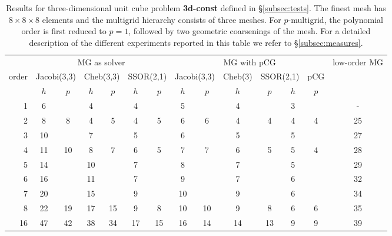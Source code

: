 \documentclass[smallcondensed,final]{svjour3}     %
\begin{document}
\begin{table}
  \caption{\label{tab:3d-box} Results for three-dimensional unit cube
    problem  {\bf 3d-const} defined in \S\ref{subsec:tests}.
    The finest
    mesh has $8\times 8\times 8$ elements and the multigrid hierarchy
    consists of three meshes.  For $p$-multigrid, the
    polynomial order is first reduced to $p=1$, followed by two
    geometric coarsenings of the mesh.
    For a
    detailed description of the different experiments reported in this
    table we refer to \S\ref{subsec:measures}.}  \centering
	  \begin{tabular}{|r|c c|c c|c c||c c|c c|c c||c|} 
	    \hline
	    & \multicolumn{6}{c||}{MG as solver} &
            \multicolumn{6}{c||}{MG with pCG} &
            \!\!low-order MG\!\! \\
	    \cline{2-13}
	    \!\!\! order \!\!\!\! &  \multicolumn{2}{c|}{\!\!\scriptsize  Jacobi(3,3)\!\!} &  \multicolumn{2}{c|}{\!\!\scriptsize Cheb(3,3)\!\!} & \multicolumn{2}{c||}{\!\!\scriptsize  SSOR(2,1)\!\!} & \multicolumn{2}{c|}{\!\!\scriptsize Jacobi(3,3)\!\!} &  \multicolumn{2,1}{c|}{\!\!\scriptsize Cheb(3)\!\!} & \multicolumn{2}{c||}{\!\!\scriptsize SSOR(2,1)\!\!} & pCG \\
	\hline
	 & $h$ & $p$ & $h$ & $p$& $h$ & $p$& $h$ & $p$& $h$ & $p$& $h$ & $p$& ~\\
	 \cline{2-13}
1 & 6 & & 4 & & 4 & & 5 & & 4 & & 3 & & -   \\
2 & 8 & 8 & 4 & 5 & 4 & 5 & 6 & 6 & 4 & 4 & 4 & 4 &  25  \\
3 & 10 & & 7 & & 5 & & 6 & & 5 & & 5 & & 27  \\
4 & 11 & 10 & 8 & 7 & 6 & 5 & 7 & 7 & 6 & 5 & 5 & 4 & 28 \\
5 & 14 & & 10 & & 7 & & 8 & & 7 & & 5 & & 29  \\
6 & 16 & & 11 & & 7 & & 9 & & 7 & & 6 & & 32  \\
7 & 20 & & 15 & & 9 & & 10 & & 9 & & 6 & & 34 \\
8 & 22 & 19 & 17 & 15 & 9 & 8 & 10 & 10 & 9 & 8 & 6 & 6 & 35 \\
16 & 47 & 42 & 38 & 34 & 17 & 15 & 16 & 14 & 14 & 13 & 9 & 9 & 39 \\
\hline 
 \end{tabular}
\end{table}
\end{document}
